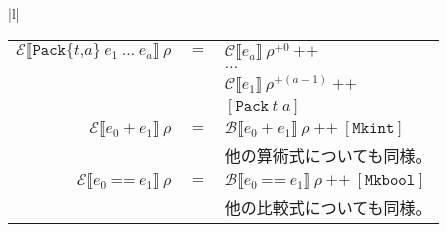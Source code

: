 \documentclass{jarticle}
\begin{document}
\begin{tabular} {|l|}
\begin{tabular}{r c l}
		$\mathcal{E} \llbracket \texttt{Pack\{} t \texttt{,} a \texttt{\}} ~ e_1 ~ \ldots ~ e_a \rrbracket ~ \rho$ & $=$ & $\mathcal{C} \llbracket e_a \rrbracket ~ \rho^{+0} ~ \texttt{++}$                                                                                                                            \\
		                                                                                                           &     & $\ldots$                                                                                                                                                                                     \\
		                                                                                                           &     & $\mathcal{C} \llbracket e_1 \rrbracket ~ \rho^{+(a-1)} ~ \texttt{++}$                                                                                                                        \\
		                                                                                                           &     & $\left[\texttt{Pack} ~ t ~ a \right]$                                                                                                                                                        \\
		$\mathcal{E} \llbracket e_0 ~ \texttt{+} ~ e_1 \rrbracket ~ \rho$                                          & $=$ & $\mathcal{B} \llbracket e_0 ~ \texttt{+} ~ e_1 \rrbracket ~ \rho ~ \texttt{++} ~ \left[\texttt{Mkint} \right]$                                                                               \\
		                                                                                                           &     & 他の算術式についても同様。                                                                                                                                                                   \\
		$\mathcal{E} \llbracket e_0 ~ \texttt{==} ~ e_1 \rrbracket ~ \rho$                                         & $=$ & $\mathcal{B} \llbracket e_0 ~ \texttt{==} ~ e_1 \rrbracket ~ \rho ~ \texttt{++} ~ \left[\texttt{Mkbool} \right]$                                                                             \\
		                                                                                                           &     & 他の比較式についても同様。                                                                                                                                                                   \\

\end{tabular}
\end{tabular}
\end{document}

